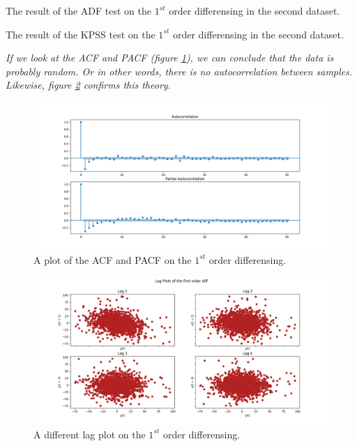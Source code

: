 \begin{table}[H]
\centering
\caption{The result of the \gls{ADF} test on the $1^{st}$ order differensing in the second dataset.}
\label{tab:Ass1_D2_ADF_1_diff}

\end{table}

\begin{table}[H]
\centering
\caption{The result of the \gls{KPSS} test on the $1^{st}$ order differensing in the second dataset.}
\label{tab:Ass1_D2_KPSS_1_diff}

\end{table}


\textit{If we look at the \gls{ACF} and \gls{PACF} (figure \ref{fig:Ass1_D2_PACF_ACF_1_diff}),  we can conclude that the data is probably random. Or in other words, there is no autocorrelation between samples. Likewise, figure \ref{fig:Ass1_D2_Lag_Plots_1_diff} confirms this theory.}


\begin{figure}[H]
    \centering
    \begin{minipage}[b]{1\textwidth}
        \includegraphics[width=\textwidth]{figures/Ass1/Ass1_D2_PACF_ACF_1_diff.png}
    \end{minipage}
    \caption{A plot of the \gls{ACF} and \gls{PACF} on the $1^{st}$ order differensing.}
    \label{fig:Ass1_D2_PACF_ACF_1_diff}
\end{figure}

\begin{figure}[H]
    \centering
    \begin{minipage}[b]{1\textwidth}
        \includegraphics[width=\textwidth]{figures/Ass1/Ass1_D2_Lag_Plots_1_diff.png}
    \end{minipage}
    \caption{A different lag plot on the $1^{st}$ order differensing.}
    \label{fig:Ass1_D2_Lag_Plots_1_diff}
\end{figure}